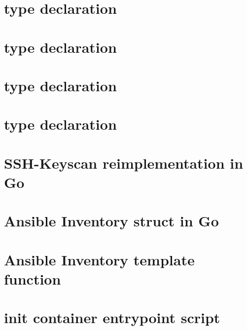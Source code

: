 \section{\anhost type declaration}
\label{app:anhostdeclare}


\section{\angroup type declaration}
\label{app:angroupdeclare}


\section{\anplaybook type declaration}
\label{app:anplaybookdeclare}


\section{\anrecjob type declaration}
\label{app:anrecjobdeclare}


\section{SSH-Keyscan reimplementation in Go}
\label{app:sshkeyscan}


\section{Ansible Inventory struct in Go}
\label{app:invstruct}


\section{Ansible Inventory template function}
\label{app:templatefunc}


\section{\anrecjob init container entrypoint script}
\label{app:initcontainerscript}


% 
